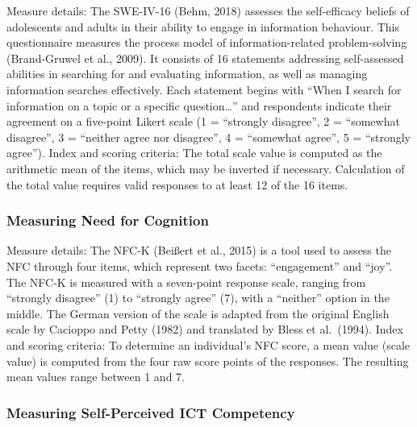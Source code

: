 \documentclass[
  12pt,
  a4paper,
  twoside]{article}
\begin{document}
Measure details: The SWE-IV-16 (Behm, 2018) assesses the self-efficacy
beliefs of adolescents and adults in their ability to engage in
information behaviour. This questionnaire measures the process model of
information-related problem-solving (Brand-Gruwel et al., 2009). It
consists of 16 statements addressing self-assessed abilities in
searching for and evaluating information, as well as managing
information searches effectively. Each statement begins with ``When I
search for information on a topic or a specific question\ldots{}'' and
respondents indicate their agreement on a five-point Likert scale (1 =
``strongly disagree'', 2 = ``somewhat disagree'', 3 = ``neither agree
nor disagree'', 4 = ``somewhat agree'', 5 = ``strongly agree''). Index
and scoring criteria: The total scale value is computed as the
arithmetic mean of the items, which may be inverted if necessary.
Calculation of the total value requires valid responses to at least 12
of the 16 items.

\subsubsection{Measuring Need for
Cognition}\label{measuring-need-for-cognition}

Measure details: The NFC-K (Beißert et al., 2015) is a tool used to
assess the NFC through four items, which represent two facets:
``engagement'' and ``joy''. The NFC-K is measured with a seven-point
response scale, ranging from ``strongly disagree'' (1) to ``strongly
agree'' (7), with a ``neither'' option in the middle. The German version
of the scale is adapted from the original English scale by Cacioppo and
Petty (1982) and translated by Bless et al.~(1994). Index and scoring
criteria: To determine an individual's NFC score, a mean value (scale
value) is computed from the four raw score points of the responses. The
resulting mean values range between 1 and 7.

\subsubsection{Measuring Self-Perceived ICT
Competency}\label{measuring-self-perceived-ict-competency}
\end{document}
